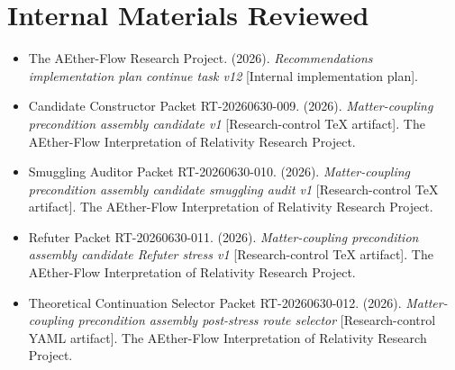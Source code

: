 \documentclass[11pt]{article}
\begin{document}
\section{Internal Materials Reviewed}

\begin{itemize}
  \item The AEther-Flow Research Project. (2026). \emph{Recommendations
  implementation plan continue task v12} [Internal implementation plan].
  \item Candidate Constructor Packet RT-20260630-009. (2026).
  \emph{Matter-coupling precondition assembly candidate v1}
  [Research-control TeX artifact]. The AEther-Flow Interpretation of
  Relativity Research Project.
  \item Smuggling Auditor Packet RT-20260630-010. (2026).
  \emph{Matter-coupling precondition assembly candidate smuggling audit v1}
  [Research-control TeX artifact]. The AEther-Flow Interpretation of
  Relativity Research Project.
  \item Refuter Packet RT-20260630-011. (2026).
  \emph{Matter-coupling precondition assembly candidate Refuter stress v1}
  [Research-control TeX artifact]. The AEther-Flow Interpretation of
  Relativity Research Project.
  \item Theoretical Continuation Selector Packet RT-20260630-012. (2026).
  \emph{Matter-coupling precondition assembly post-stress route selector}
  [Research-control YAML artifact]. The AEther-Flow Interpretation of
  Relativity Research Project.
\end{itemize}
\end{document}

